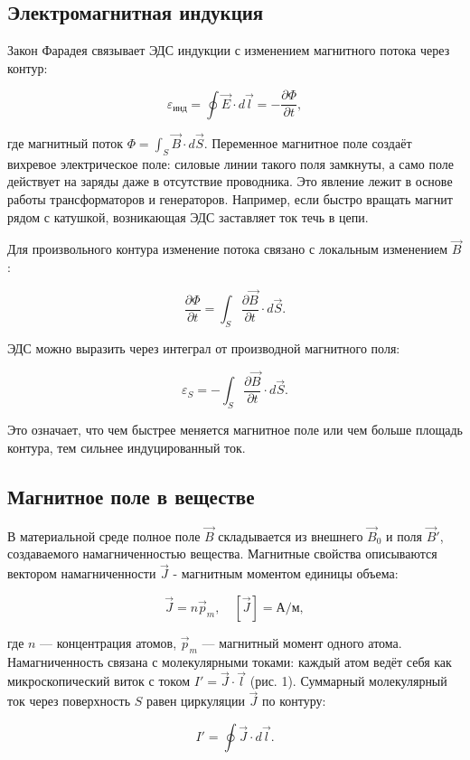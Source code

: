 \documentclass[12pt]{article}
\begin{document}
\subsection{Электромагнитная индукция}

Закон Фарадея связывает ЭДС индукции с изменением магнитного потока через контур:

\[
    \varepsilon_{\text{инд}} = \oint \vec{E} \cdot d\vec{l} = -\frac{\partial \Phi}{\partial t},
\]

где магнитный поток $\Phi = \int_S \vec{B} \cdot d\vec{S}$. 
Переменное магнитное поле создаёт вихревое электрическое поле: 
силовые линии такого поля замкнуты, а само поле действует на заряды даже в отсутствие проводника. 
Это явление лежит в основе работы трансформаторов и генераторов. 
Например, если быстро вращать магнит рядом с катушкой, возникающая ЭДС заставляет ток течь в цепи.

Для произвольного контура изменение потока связано с локальным изменением $\vec{B}$:

\[
    \frac{\partial \Phi}{\partial t} = \int_S \frac{\partial \vec{B}}{\partial t} \cdot d\vec{S}.
\]

ЭДС можно выразить через интеграл от производной магнитного поля:

\[
    \varepsilon_S = -\int_S \frac{\partial \vec{B}}{\partial t} \cdot d\vec{S}.
\]

Это означает, что чем быстрее меняется магнитное поле или чем больше площадь контура, 
тем сильнее индуцированный ток.

\subsection{Магнитное поле в веществе}

В материальной среде полное поле $\vec{B}$ складывается из внешнего $\vec{B}_0$ и поля $\vec{B}'$, 
создаваемого намагниченностью вещества. Магнитные свойства описываются вектором намагниченности $\vec{J}$ - 
магнитным моментом единицы объема:

\[
    \vec{J} = n\vec{p}_m, \quad [\vec{J}] = \text{А/м},
\]


где $n$ — концентрация атомов, $\vec{p}_m$ — магнитный момент одного атома. Намагниченность связана с молекулярными токами: каждый атом ведёт себя как микроскопический виток с током $I' = \vec{J} \cdot \vec{l}$ (рис. 1). Суммарный молекулярный ток через поверхность $S$ равен циркуляции $\vec{J}$ по контуру:

\[
    I' = \oint \vec{J} \cdot d\vec{l}.
\]
\end{document}
